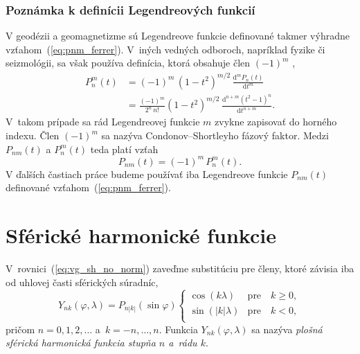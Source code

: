\documentclass[a4paper,12pt]{book}
\newcommand{\diff}{\mathrm d}
\begin{document}
\subsubsection{Poznámka k definícii Legendreových funkcií}

V geodézii a geomagnetizme sú Legendreove funkcie definované takmer výhradne 
vzťahom~(\ref{eq:pnm_ferrer}).  V~iných vedných odboroch, napríklad fyzike či 
seizmológii, sa však používa definícia, ktorá obsahuje člen $(-1)^m$ 
\parencite[napríklad][]{Wieczorek2015},
%
\begin{equation}
\begin{split}
P_n^m(t) &= (-1)^m \, (1 - t^2)^{m \slash 2} \, \frac{\diff^m P_n(t)}{\diff 
t^m}\\
%
&= \frac{(-1)^m}{2^n \, n!} (1 - t^2)^{ m \slash 2} \, \frac{\diff^{n + m}
(t^2 - 1)^n}{\diff t^{n + m}}{.}
\end{split}
\end{equation}
%
V~takom prípade sa rád Legendreovej funkcie $m$ zvykne zapisovať do horného 
indexu.  Člen $(-1)^{m}$ sa nazýva Condonov--Shortleyho fázový faktor.  Medzi 
$P_{nm}(t)$ a $P_n^m(t)$ teda platí vzťah
%
\begin{equation}
P_{nm}(t) = (-1)^m \, P_n^m(t){.}
\end{equation}
%
V ďalších častiach práce budeme používať iba Legendreove funkcie $P_{nm}(t)$ 
definované vzťahom~(\ref{eq:pnm_ferrer}).




\section{Sférické harmonické funkcie}
\label{sec:spherical_harmonics}

V~rovnici~(\ref{eq:vg_sh_no_norm}) zaveďme substitúciu pre členy, ktoré závisia
iba od uhlovej časti sférických súradníc,
%
\begin{equation}
\label{eq:ynk_no_norm}
Y_{nk}(\varphi, \lambda) = P_{n|k|}(\sin\varphi)
%
\begin{cases}
\cos(k\lambda)    &\text{pre} \quad k \geq 0{,}\\
\sin(|k|\lambda)  &\text{pre} \quad k < 0{,}\\
\end{cases}
\end{equation}
%
pričom $n = 0, 1, 2, \dots$ a~$k = -n, \dots, n$.  Funkcia $Y_{nk}(\varphi,
\lambda)$ sa nazýva \emph{plošná sférická harmonická funkcia stupňa $n$ a~rádu
$k$}.
\end{document}
